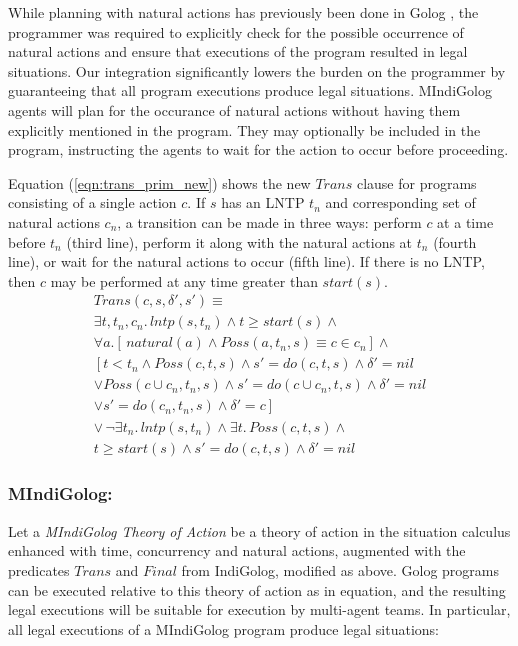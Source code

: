 \documentclass[letterpaper]{article}
\begin{document}
While planning with natural actions has previously been done in Golog
\cite{pirri00planning_nat_acts}, the programmer
was required to explicitly check for the possible occurrence of natural
actions and ensure that executions of the program resulted in legal
situations. Our integration significantly lowers the burden on the
programmer by guaranteeing that all program executions produce legal
situations.
MIndiGolog agents will plan for the occurance of natural actions
without having them explicitly mentioned in the program.  They may
optionally be included in the program, instructing the agents to wait for
the action to occur before proceeding.

Equation (\ref{eqn:trans_prim_new}) shows the new $Trans$ clause for programs
consisting of a single action $c$.  If $s$ has an LNTP $t_n$ and corresponding
set of natural actions $c_n$, a transition can be made in three ways:
perform $c$ at a time before $t_n$ (third line), perform it along with
the natural actions at $t_n$ (fourth line), or wait for the natural
actions to occur (fifth line).  If there is no LNTP, then $c$ may be
performed at any time greater than $start(s)$.
\begin{multline}
\label{eqn:trans_prim_new}
Trans(c,s,\delta',s')\equiv \\
  \exists t,t_n,c_n.\,lntp(s,t_n) \wedge t\geq start(s) \wedge\\
      \forall a.\left[\,natural(a)\wedge Poss(a,t_n,s)\equiv c\in c_n\right]\wedge\\
      \left[ t<t_n\wedge Poss(c,t,s)\wedge s'=do(c,t,s)\wedge \delta'=nil\right.\\
            \vee Poss(c\cup c_n,t_n,s)\wedge s'=do(c\cup c_n,t,s)\wedge \delta'=nil\\
            \vee \left.s'=do(c_n,t_n,s)\wedge \delta'=c\right]\\
  \vee\,\neg\exists t_{n}.\,lntp(s,t_{n})\wedge\exists t.\,Poss(c,t,s)\wedge\\
  t\geq start(s)\wedge s'=do(c,t,s)\wedge\delta'=nil
\end{multline}

\subsubsection{MIndiGolog:}
Let a \emph{MIndiGolog Theory of Action} be a theory
of action in the situation calculus enhanced with time, concurrency and
natural actions, augmented with the predicates $Trans$ and $Final$ from
IndiGolog, modified as above.
Golog programs can be executed relative to this
theory of action as in equation, and the resulting legal
executions will be suitable for execution by multi-agent teams.
In particular, all legal executions of a MIndiGolog
program produce legal situations:
\end{document}
